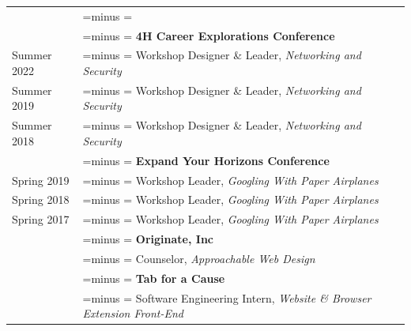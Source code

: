 \documentclass[letterpaper,10pt,oneside]{article}
\makeatletter
\newlength{\leftcol}  \setlength{\leftcol}{1.05in}
\newlength{\colsep}   \setlength{\colsep}{1em}
\newlength{\rightcol}
\newcommand{\balancedrag}{%
  \setlength{\rightskip}{0pt plus 0.45\rightcol}%
  \setlength{\parfillskip}{0pt}%
  \spaceskip=\fontdimen2\font minus \fontdimen4\font
  \xspaceskip=\spaceskip
  \hbadness=10000 \hyphenpenalty=10000 \exhyphenpenalty=10000 \emergencystretch=0pt}
\newenvironment{cvsection}[1]
  {\par\vspace{0.9em}%
   \setlength{\rightcol}{\dimexpr\linewidth-\leftcol-\colsep\relax}%
   \noindent\begin{longtable}[l]{@{}>{\raggedleft\arraybackslash}p{\leftcol}@{\hspace{\colsep}}>{\raggedright\balancedrag\arraybackslash}p{\rightcol}@{}}
   \multicolumn{2}{@{}l}{\Large #1} \\*\noalign{\nobreak\vspace{0.4em}}}
  {\end{longtable}}
\newcommand{\gap}{\noalign{\vspace{0.4em}}}
\makeatother
\begin{document}

\begin{cvsection}{Outreach}
  \noalign{\vspace{-1.1em}}
  & \textbf{4H Career Explorations Conference} \\*
  Summer 2022 & Workshop Designer \& Leader, \emph{Networking and Security} \\*
  Summer 2019 & Workshop Designer \& Leader, \emph{Networking and Security} \\*
  Summer 2018 & Workshop Designer \& Leader, \emph{Networking and Security} \\
  \gap
  & \textbf{Expand Your Horizons Conference} \\*
  Spring 2019 & Workshop Leader, \emph{Googling With Paper Airplanes} \\*
  Spring 2018 & Workshop Leader, \emph{Googling With Paper Airplanes} \\*
  Spring 2017 & Workshop Leader, \emph{Googling With Paper Airplanes} \\
  \gap
  & \textbf{Originate, Inc} \\*
  2015 & Counselor, \emph{Approachable Web Design} \\
  \gap
  & \textbf{Tab for a Cause} \\*
  2014 & Software Engineering Intern, \emph{Website \& Browser Extension Front-End} \\
\end{cvsection}

\end{document}
